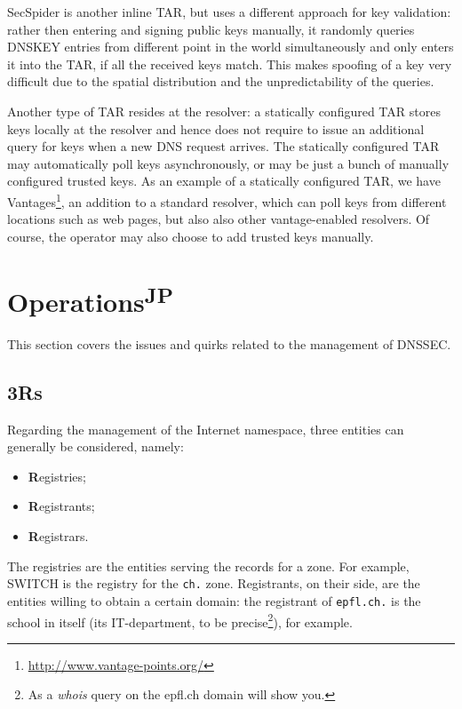 \documentclass[a4paper,twocolumn]{scrartcl}
\newcommand{\wbjp}{\textsuperscript{JP}}
\begin{document}
SecSpider \cite{secspider, Osterweil09} is another inline TAR, but
uses a different approach for key validation: rather then entering and
signing public keys manually, it randomly queries DNSKEY entries from
different point in the world simultaneously and only enters it into
the TAR, if all the received keys match. This makes spoofing of a key
very difficult due to the spatial distribution and the
unpredictability of the queries.

Another type of TAR resides at the resolver: a statically configured
TAR stores keys locally at the resolver and hence does not require to issue an
additional query for keys when a new DNS request arrives. The
statically configured TAR may automatically poll keys asynchronously,
or may be just a bunch of manually configured trusted keys. As an
example of a statically configured TAR, we have
Vantages\footnote{\url{http://www.vantage-points.org/}}, an addition
to a standard resolver, \cite{Osterweil09} which can poll keys from
different locations such as web pages, but also also other
vantage-enabled resolvers. Of course, the operator may also choose to
add trusted keys manually.

\section{Operations\wbjp}
This section covers the issues and quirks related to the management of DNSSEC.
\subsection{3Rs}
Regarding the management of the Internet namespace, three entities can generally be considered, namely:
\begin{itemize}
\item \textbf{R}egistries;
\item \textbf{R}egistrants;
\item \textbf{R}egistrars.
\end{itemize}

The registries are the entities serving the records for a zone. For example, SWITCH is the registry for the \verb|ch.| zone. Registrants, on their side, are the entities willing to obtain a certain domain: the registrant of \verb|epfl.ch.| is the school in itself (its IT-department, to be precise\footnote{As a \emph{whois} query on the epfl.ch domain will show you.}), for example.
\end{document}
